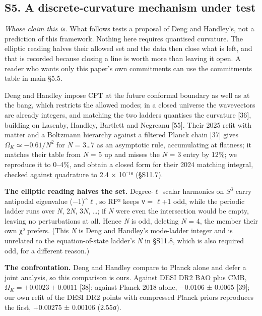 \documentclass[
]{article}
\begin{document}
\subsection{S5. A discrete-curvature mechanism under
test}\label{s5.-a-discrete-curvature-mechanism-under-test}

\emph{Whose claim this is.} What follows tests a proposal of Deng and
Handley's, not a prediction of this framework. Nothing here requires
quantised curvature. The elliptic reading halves their allowed set and
the data then close what is left, and that is recorded because closing a
line is worth more than leaving it open. A reader who wants only this
paper's own commitments can use the commitments table in main §5.5.

Deng and Handley impose CPT at the future conformal boundary as well as
at the bang, which restricts the allowed modes; in a closed universe the
wavevectors are already integers, and matching the two ladders quantises
the curvature {[}36{]}, building on Lasenby, Handley, Bartlett and
Negreanu {[}55{]}. Their 2025 refit with matter and a Boltzmann
hierarchy against a filtered Planck chain {[}37{]} gives
\(\Omega_K\simeq-0.61/N^2\) for \emph{N} = 3\ldots7 as an asymptotic
rule, accumulating at flatness; it matches their table from \emph{N} = 5
up and misses the \emph{N} = 3 entry by 12\%; we reproduce it to 0--4\%,
and obtain a closed form for their 2024 matching integral, checked
against quadrature to 2.4 × 10⁻¹⁶ (§S11.7).

\textbf{The elliptic reading halves the set.} Degree-\(\ell\) scalar
harmonics on \(S^3\) carry antipodal eigenvalue (−1)\^{}\(\ell\), so RP³
keeps ν = \(\ell\)+1 odd, while the periodic ladder runs over \emph{N},
2\emph{N}, 3\emph{N}, \ldots; if \emph{N} were even the intersection
would be empty, leaving no perturbations at all. Hence \emph{N} is odd,
deleting \emph{N} = 4, the member their own χ² prefers. (This \emph{N}
is Deng and Handley's mode-ladder integer and is unrelated to the
equation-of-state ladder's \emph{N} in §S11.8, which is also required
odd, for a different reason.)

\textbf{The confrontation.} Deng and Handley compare to Planck alone and
defer a joint analysis, so this comparison is ours. Against DESI DR2 BAO
plus CMB, \(\Omega_K=+0.0023\pm0.0011\) {[}38{]}; against Planck 2018
alone, −0.0106 ± 0.0065 {[}39{]}; our own refit of the DESI DR2 points
with compressed Planck priors reproduces the first, +0.00275 ± 0.00106
(2.55σ).
\end{document}
